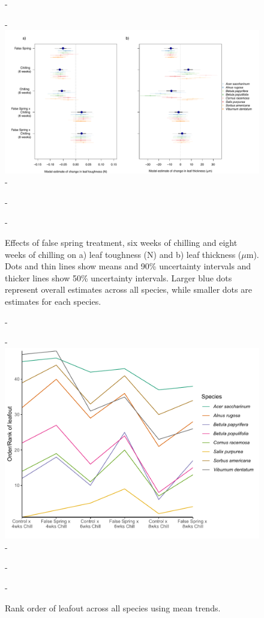 \documentclass{article}\usepackage[]{graphicx}\usepackage[]{color}
\begin{document}
  {\begin{figure} [H]
  -\begin{center}
  -\includegraphics[width=18cm]{..//analyses/figures/mu_leaftraits.pdf} 
  -\caption{Effects of false spring treatment, six weeks of chilling and eight weeks of chilling on a) leaf toughness (N) and b) leaf thickness ($\mu$m). Dots and thin lines show means and 90\% uncertainty intervals and thicker lines show 50\% uncertainty intervals. Larger blue dots represent overall estimates across all species, while smaller dots are estimates for each species. }\label{fig:muleaf}
  -\end{center}
  -\end{figure}}
  
  {\begin{figure} [H]
  -\begin{center}
  -\includegraphics[width=12cm]{..//analyses/figures/leafoutorder_byrank.pdf} 
  -\caption{Rank order of leafout across all species using mean trends. }\label{fig:rank}
  -\end{center}
  -\end{figure}}
  
\end{document}
